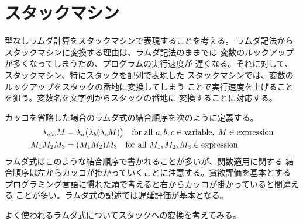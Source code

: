 \section{スタックマシン}\label{s1:スタックマシン} %
	型なしラムダ計算をスタックマシンで表現することを考える。
	ラムダ記法からスタックマシンに変換する理由は、ラムダ記法のままでは
	変数のルックアップが多くなってしまうため、プログラムの実行速度が
	遅くなる。それに対して、スタックマシン、特にスタックを配列で表現した
	スタックマシンでは、変数のルックアップをスタックの番地に変換してしまう
	ことで実行速度を上げることを狙う。変数名を文字列からスタックの番地に
	変換することに対応する。

	カッコを省略した場合のラムダ式の結合順序を次のように定義する。
	\begin{equation*}\begin{split} %
		\lfnc{abc}{M} &= \lfnc{a}{\bigr(\lfnc{b}{(\lfnc{c}{M}})\bigr)}
		\quad\text{for all }a,b,c\in\text{variable},\;M\in\text{expression} \\
		M_1M_2M_3 &= (M_1M_2)M_3
		\quad\text{for all }M_1,M_2,M_3\in\text{expression} \\
	\end{split}\end{equation*} %
	ラムダ式はこのような結合順序で書かれることが多いが、関数適用に関する
	結合順序は左からカッコが掛かっていくことに注意する。貪欲評価を基本とする
	プログラミング言語に慣れた頭で考えると右からカッコが掛かっていると間違える
	ことが多い。ラムダ式の記述では遅延評価が基本となる。

	よく使われるラムダ式についてスタックへの変換を考えてみる。

